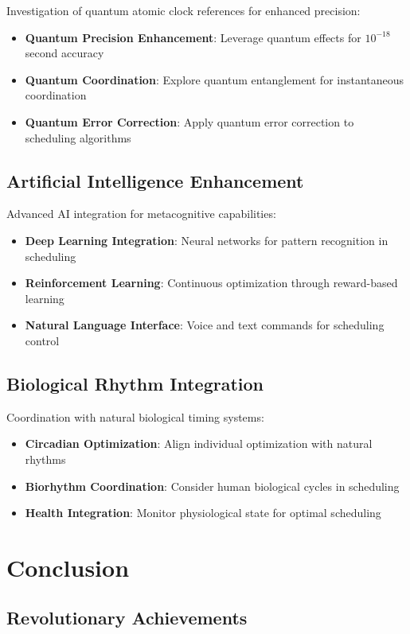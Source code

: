 \documentclass[12pt,a4paper]{article}
\begin{document}
Investigation of quantum atomic clock references for enhanced precision:
\begin{itemize}
\item \textbf{Quantum Precision Enhancement}: Leverage quantum effects for $10^{-18}$ second accuracy
\item \textbf{Quantum Coordination}: Explore quantum entanglement for instantaneous coordination
\item \textbf{Quantum Error Correction}: Apply quantum error correction to scheduling algorithms
\end{itemize}

\subsection{Artificial Intelligence Enhancement}

Advanced AI integration for metacognitive capabilities:
\begin{itemize}
\item \textbf{Deep Learning Integration}: Neural networks for pattern recognition in scheduling
\item \textbf{Reinforcement Learning}: Continuous optimization through reward-based learning
\item \textbf{Natural Language Interface}: Voice and text commands for scheduling control
\end{itemize}

\subsection{Biological Rhythm Integration}

Coordination with natural biological timing systems:
\begin{itemize}
\item \textbf{Circadian Optimization}: Align individual optimization with natural rhythms
\item \textbf{Biorhythm Coordination}: Consider human biological cycles in scheduling
\item \textbf{Health Integration}: Monitor physiological state for optimal scheduling
\end{itemize}

\section{Conclusion}

\subsection{Revolutionary Achievements}
\end{document}
